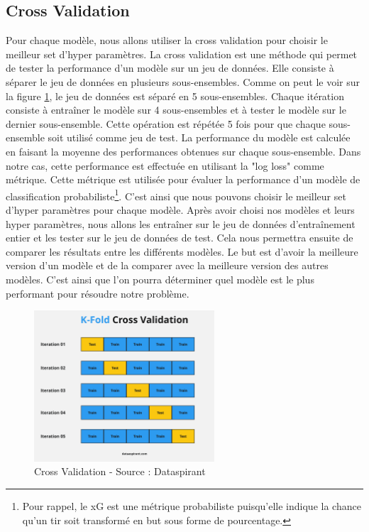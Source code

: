 \documentclass[12pt]{article}
\begin{document}
\subsection{Cross Validation}
\label{sec:cross_validation}
Pour chaque modèle, nous allons utiliser la cross validation pour choisir le meilleur set d'hyper paramètres.
La cross validation est une méthode qui permet de tester la performance d'un modèle sur un jeu de données.
Elle consiste à séparer le jeu de données en plusieurs sous-ensembles.
Comme on peut le voir sur la figure \ref{fig:cross_validation}, le jeu de données est séparé en 5 sous-ensembles.
Chaque itération consiste à entraîner le modèle sur 4 sous-ensembles et à tester le modèle sur le dernier sous-ensemble.
Cette opération est répétée 5 fois pour que chaque sous-ensemble soit utilisé comme jeu de test.
La performance du modèle est calculée en faisant la moyenne des performances obtenues sur chaque sous-ensemble.
Dans notre cas, cette performance est effectuée en utilisant la "log loss" comme métrique.
Cette métrique est utilisée pour évaluer la performance d'un modèle de classification probabiliste\footnote{Pour rappel, le xG est une métrique probabiliste puisqu'elle indique la chance qu'un tir soit transformé en but sous forme de pourcentage.}.
C'est ainsi que nous pouvons choisir le meilleur set d'hyper paramètres pour chaque modèle.
\newline\newline
Après avoir choisi nos modèles et leurs hyper paramètres, nous allons les entraîner sur le jeu de données d'entraînement entier et les tester sur le jeu de données de test.
Cela nous permettra ensuite de comparer les résultats entre les différents modèles.
Le but est d'avoir la meilleure version d'un modèle et de la comparer avec la meilleure version des autres modèles. 
C'est ainsi que l'on pourra déterminer quel modèle est le plus performant pour résoudre notre problème.
\begin{figure}[htp]
    \centering
    \includegraphics[width=0.6\textwidth]{img/cross_validation_schema.png}
    \caption{Cross Validation - Source : Dataspirant}
    \label{fig:cross_validation}
\end{figure}
\end{document}
